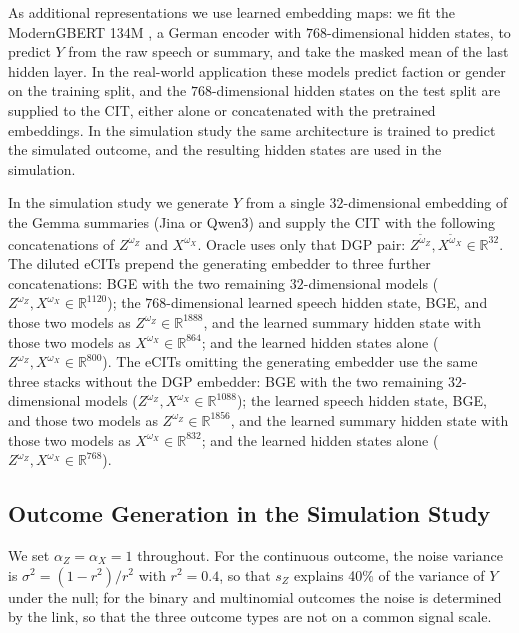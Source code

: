 \documentclass[twoside,11pt]{article}
\begin{document}
As additional representations we use learned embedding maps: we fit the ModernGBERT 134M \citep{wunderle2025new}, a German encoder with $768$-dimensional hidden states, to predict $Y$ from the raw speech or summary, and take the masked mean of the last hidden layer. In the real-world application these models predict faction or gender on the training split, and the $768$-dimensional hidden states on the test split are supplied to the CIT, either alone or concatenated with the pretrained embeddings. In the simulation study the same architecture is trained to predict the simulated outcome, and the resulting hidden states are used in the simulation.

In the simulation study we generate $Y$ from a single $32$-dimensional embedding of the Gemma summaries (Jina or Qwen3) and supply the CIT with the following concatenations of $Z^{\omega_Z}$ and $X^{\omega_X}$. Oracle uses only that DGP pair: $Z^{\widetilde{\omega}_Z},X^{\widetilde{\omega}_X}\in\mathbb{R}^{32}$. 
The diluted eCITs prepend the generating embedder to three further concatenations: BGE with the two remaining $32$-dimensional models ($Z^{\omega_Z},X^{\omega_X}\in\mathbb{R}^{1120}$); the $768$-dimensional learned speech hidden state, BGE, and those two models as $Z^{\omega_Z}\in\mathbb{R}^{1888}$, and the learned summary hidden state with those two models as $X^{\omega_X}\in\mathbb{R}^{864}$; and the learned hidden states alone ($Z^{\omega_Z},X^{\omega_X}\in\mathbb{R}^{800}$).
The eCITs omitting the generating embedder use the same three stacks without the DGP embedder: BGE with the two remaining $32$-dimensional models  ($Z^{\omega_Z},X^{\omega_X}\in\mathbb{R}^{1088}$); the learned speech hidden state, BGE, and those two models as $Z^{\omega_Z}\in\mathbb{R}^{1856}$, and the learned summary hidden state with those two models as $X^{\omega_X}\in\mathbb{R}^{832}$; and the learned hidden states alone ($Z^{\omega_Z},X^{\omega_X}\in\mathbb{R}^{768}$).

\subsection{Outcome Generation in the Simulation Study}
\label{app:dgm_details}

We set $\alpha_Z = \alpha_X = 1$ throughout. For the continuous outcome, the noise variance is $\sigma^2 = (1-r^2)/r^2$ with $r^2 = 0.4$, so that $s_Z$ explains 40\% of the variance of $Y$ under the null; for the binary and multinomial outcomes the noise is determined by the link, so that the three outcome types are not on a common signal scale.
\end{document}
